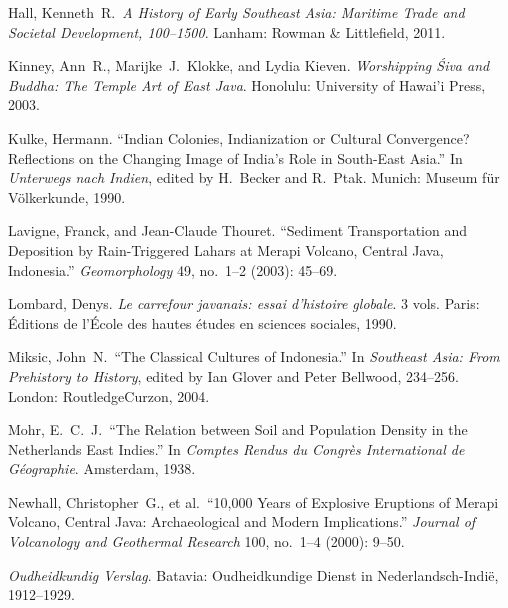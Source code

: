 \documentclass[12pt,a4paper]{article}
\begin{document}
\vspace{0.5em}
\noindent Hall, Kenneth~R.\ \emph{A History of Early Southeast Asia: Maritime Trade and Societal Development, 100--1500}. Lanham: Rowman \& Littlefield, 2011.

\vspace{0.5em}
\noindent Kinney, Ann~R., Marijke~J.\ Klokke, and Lydia Kieven. \emph{Worshipping \'{S}iva and Buddha: The Temple Art of East Java}. Honolulu: University of Hawai'i Press, 2003.

\vspace{0.5em}
\noindent Kulke, Hermann. ``Indian Colonies, Indianization or Cultural Convergence? Reflections on the Changing Image of India's Role in South-East Asia.'' In \emph{Unterwegs nach Indien}, edited by H.\ Becker and R.\ Ptak. Munich: Museum f\"{u}r V\"{o}lkerkunde, 1990.

\vspace{0.5em}
\noindent Lavigne, Franck, and Jean-Claude Thouret. ``Sediment Transportation and Deposition by Rain-Triggered Lahars at Merapi Volcano, Central Java, Indonesia.'' \emph{Geomorphology} 49, no.~1--2 (2003): 45--69.

\vspace{0.5em}
\noindent Lombard, Denys. \emph{Le carrefour javanais: essai d'histoire globale}. 3 vols. Paris: \'{E}ditions de l'\'{E}cole des hautes \'{e}tudes en sciences sociales, 1990.

\vspace{0.5em}
\noindent Miksic, John~N.\ ``The Classical Cultures of Indonesia.'' In \emph{Southeast Asia: From Prehistory to History}, edited by Ian Glover and Peter Bellwood, 234--256. London: RoutledgeCurzon, 2004.

\vspace{0.5em}
\noindent Mohr, E.~C.~J.\ ``The Relation between Soil and Population Density in the Netherlands East Indies.'' In \emph{Comptes Rendus du Congr\`{e}s International de G\'{e}ographie}. Amsterdam, 1938.

\vspace{0.5em}
\noindent Newhall, Christopher~G., et al.\ ``10,000 Years of Explosive Eruptions of Merapi Volcano, Central Java: Archaeological and Modern Implications.'' \emph{Journal of Volcanology and Geothermal Research} 100, no.~1--4 (2000): 9--50.

\vspace{0.5em}
\noindent \emph{Oudheidkundig Verslag}. Batavia: Oudheidkundige Dienst in Nederlandsch-Indi\"{e}, 1912--1929.
\end{document}
